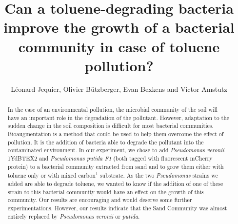 \documentclass[a4paper, 10pt, conference]{ieeeconf}   %
\title{\LARGE \bf
Can a toluene-degrading bacteria improve the growth of a bacterial community in case of toluene pollution?
}
\author{Léonard Jequier, Olivier Bützberger, Evan Bexkens and Victor Amstutz%
}
\begin{document}
\vspace{-2cm}
\maketitle
\thispagestyle{plain}
\pagestyle{plain}

\begin{abstract}

	

In the case of an environmental pollution, the microbial community of the soil will have an important role in the degradation of the pollutant. However, adaptation to the sudden change in the soil composition is difficult for most bacterial communities. Bioaugmentation is a method that could be used to help them overcome the effect of pollution. It is the addition of bacteria able to degrade the pollutant into the contaminated environment. In our experiment, we chose to add \textit{Pseudomonas veronii} 1YdBTEX2 and \textit{Pseudomonas putida F1} (both tagged with fluorescent mCherry protein) to a bacterial community extracted from sand and to grow them either with toluene only or with mixed carbon\textsuperscript{1} substrate. As the two \textit{Pseudomonas} strains we added are able to degrade toluene, we wanted to know if the addition of one of these strain to this bacterial community would have an effect on the growth of this community.
Our results are encouraging and would deserve some further experimentations. However, our results indicate that the Sand Community was almost entirely replaced by \textit{Pseudomonas veronii} or \textit{putida}.


\end{abstract}
\end{document}
